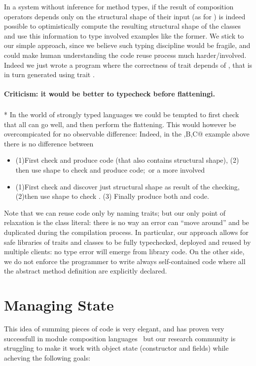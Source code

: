 In a system without inference for method types,
if the result of composition operators depends only on the
structural shape of their input (as for \use)
is indeed possible to optimistically compute the resulting structural shape of the classes
and use this information to type involved examples like the former.
We stick to our simple approach, since we believe such typing discipline would be fragile,
and could make human understanding the code reuse process much harder/involved.
Indeed we just wrote a program where the correctness of trait \Q@t@ depends of 
\Q@A@, that is in turn generated using trait \Q@t@.

\paragraph*{Criticism: it would be better to typecheck before flatteningi.}${}_{}$\\*
In the world of strongly typed languages we could be tempted to
first check that all can go well, and then perform the flattening.
This would however be overcompicated for no observable difference:
Indeed, in the \Q@A,B,C@ example above there is no difference
between
\begin{itemize}
\item  (1)First check \Q@B@ and produce \Q@B@ code (that also contains \Q@B@ structural shape),
  (2) then use \Q@B@ shape to check \Q@C@ and produce \Q@C@ code;\ 
or a more involved
\item  (1)First check \Q@B@ and discover just \Q@B@ structural shape as result of the checking,
  (2)then use \Q@B@ shape to check \Q@C@.
  (3) Finally produce both \Q@B@ and \Q@C@ code.
\end{itemize}

Note that we can reuse code only by naming traits; but our only point of relaxation is the class literal: there is no way an error can ``move around'' and be duplicated during the compilation process.
In particular, our approach allows for safe libraries of traits and classes to be fully typechecked, deployed and reused by multiple clients: no type error will emerge from library code.
On the other side, we do not enforce the programmer to write always self-contained code where all the abstract method definition are explicitly declared.

\section{Managing State}
This idea of summing pieces of code is very elegant,
and has proven very successfull in module composition languages~\cite{ancona2002calculus} but our research community is struggling to
make it work with object state (constructor and fields) while acheving the following goals:

